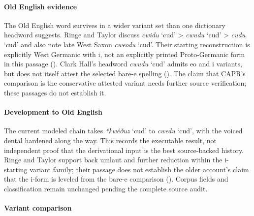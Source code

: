 \documentclass[
  british,
  a4paper,
]{article}
\providecommand{\Recon}[1]{\emph{*#1}}
\begin{document}
\paragraph{Old English evidence}\label{old-english-evidence-87}

The Old English word survives in a wider variant set than one dictionary
headword suggests. Ringe and Taylor discuss {\emph{cwidu}} `cud'
\textgreater{} {\emph{cwudu}} `cud' \textgreater{} {\emph{cudu}} `cud'
and also note late West Saxon {\emph{cweodu}} `cud'. Their starting
reconstruction is explicitly West Germanic with i, not an explicitly
printed Proto-Germanic form in this passage
(). Clark
Hall's headword {\emph{cwudu}} `cud' admits eo and i variants, but does
not itself attest the selected bare-e spelling
(). The claim that
CAPR's comparison is the conservative attested variant needs further
source verification; these passages do not establish it.

\paragraph{Development to Old
English}\label{development-to-old-english-85}

The current modeled chain takes \Recon{kwéðuz} `cud' to {\emph{cwedu}}
`cud', with the voiced dental hardened along the way. This records the
executable result, not independent proof that the derivational input is
the best source-backed history. Ringe and Taylor support back umlaut and
further reduction within the i-starting variant family; their passage
does not establish the older account's claim that the i-form is leveled
from the bare-e comparison (). Corpus fields and classification remain unchanged
pending the complete source audit.

\paragraph{Variant comparison}\label{variant-comparison}
\end{document}
